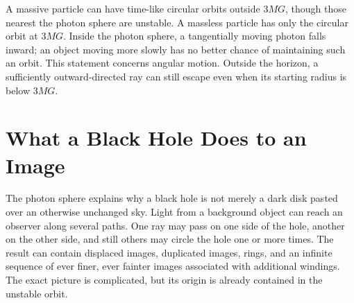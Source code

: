 \begin{classroomqa}
\end{classroomqa}

\begin{classroomqa}
\end{classroomqa}

A massive particle can have time-like circular orbits outside \(3MG\), though
those nearest the photon sphere are unstable.  A massless particle has only
the circular orbit at \(3MG\).  Inside the photon sphere, a tangentially moving
photon falls inward; an object moving more slowly has no better chance of
maintaining such an orbit.  This statement concerns angular motion.  Outside
the horizon, a sufficiently outward-directed ray can still escape even when
its starting radius is below \(3MG\).

\section{What a Black Hole Does to an Image}

The photon sphere explains why a black hole is not merely a dark disk pasted
over an otherwise unchanged sky.  Light from a background object can reach an
observer along several paths.  One ray may pass on one side of the hole,
another on the other side, and still others may circle the hole one or more
times.  The result can contain displaced images, duplicated images, rings, and
an infinite sequence of ever finer, ever fainter images associated with
additional windings.  The exact picture is complicated, but its origin is
already contained in the unstable orbit.


